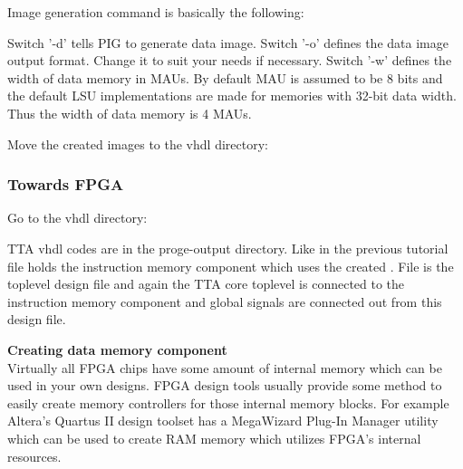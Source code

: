 \documentclass[a4paper,twoside]{tceusermanual}
\begin{document}
Image generation command is basically the following:


Switch '-d' tells PIG to generate data image. Switch '-o' defines the data
image output format. Change it to suit your needs if necessary. Switch '-w'
defines the width of data memory in MAUs. By default MAU is assumed to be 8
bits and the default LSU implementations are made for memories with 32-bit
data width. Thus the width of data memory is 4 MAUs.

Move the created images to the vhdl directory:



\subsubsection{Towards FPGA}
Go to the vhdl directory:


TTA vhdl codes are in the proge-output directory. Like in the previous
tutorial file  holds the instruction memory
component which uses the created . File
 is the toplevel design file and again the
TTA core toplevel is connected to the instruction memory component and global
signals are connected out from this design file.

\textbf{Creating data memory component} \\
Virtually all FPGA chips have some amount of internal memory which can be used
in your own designs. FPGA design tools usually provide some method to easily
create memory controllers for those internal memory blocks. For example
Altera's Quartus II design toolset has a MegaWizard Plug-In Manager utility
which can be used to create RAM memory which utilizes FPGA's internal
resources.
\end{document}
